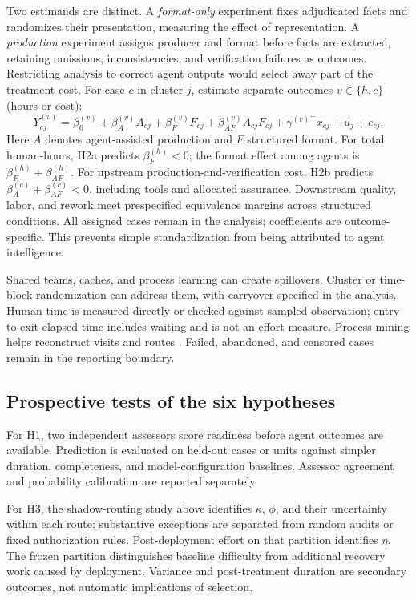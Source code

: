 Two estimands are distinct. A \emph{format-only} experiment fixes adjudicated facts and randomizes
their presentation, measuring the effect of representation. A \emph{production} experiment assigns
producer and format before facts are extracted, retaining omissions, inconsistencies, and verification
failures as outcomes. Restricting analysis to correct agent outputs would select away part of the
treatment cost. For case $c$ in cluster $j$, estimate separate outcomes $v\in\{h,c\}$ (hours or cost):
\begin{equation}
Y^{(v)}_{cj}=\beta^{(v)}_{0}+\beta^{(v)}_{A}A_{cj}+\beta^{(v)}_{F}F_{cj}+\beta^{(v)}_{AF}A_{cj}F_{cj}
+\gamma^{(v)\top}x_{cj}+u_j+e_{cj}. \label{eq:factorial}
\end{equation}
Here $A$ denotes agent-assisted production and $F$ structured format. For total human-hours, H2a
predicts $\beta^{(h)}_{F}<0$; the format effect among agents is $\beta^{(h)}_{F}+\beta^{(h)}_{AF}$.
For upstream production-and-verification cost, H2b predicts $\beta^{(c)}_{A}+\beta^{(c)}_{AF}<0$,
including tools and allocated assurance. Downstream quality, labor, and rework meet prespecified
equivalence margins across structured conditions. All assigned cases remain in the analysis;
coefficients are outcome-specific. This prevents simple standardization from being attributed to agent
intelligence.

Shared teams, caches, and process learning can create spillovers. Cluster or time-block randomization
can address them, with carryover specified in the analysis. Human time is measured directly or checked
against sampled observation; entry-to-exit elapsed time includes waiting and is not an effort measure.
Process mining helps reconstruct visits and routes \citep{vanderaalst2016}. Failed, abandoned, and
censored cases remain in the reporting boundary.

\subsection{Prospective tests of the six hypotheses}

For H1, two independent assessors score readiness before agent outcomes are available. Prediction is
evaluated on held-out cases or units against simpler duration, completeness, and model-configuration
baselines. Assessor agreement and probability calibration are reported separately.

For H3, the shadow-routing study above identifies $\kappa$, $\phi$, and their uncertainty within each
route; substantive exceptions are separated from random audits or fixed authorization rules.
Post-deployment effort on that partition identifies $\eta$. The frozen partition distinguishes baseline
difficulty from additional recovery work caused by deployment. Variance and post-treatment duration
are secondary outcomes, not automatic implications of selection.

